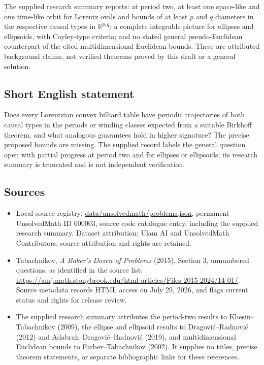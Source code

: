 \documentclass[11pt]{article}
\newcommand{\R}{\mathbb{R}}
\begin{document}
The supplied research summary reports: at period two, at least one space-like and one time-like orbit for Lorentz ovals and bounds of at least $p$ and $q$ diameters in the respective causal types in $\R^{p,q}$; a complete integrable picture for ellipses and ellipsoids, with Cayley-type criteria; and no stated general pseudo-Euclidean counterpart of the cited multidimensional Euclidean bounds. These are attributed background claims, not verified theorems proved by this draft or a general solution.
\subsection{Short English statement}
Does every Lorentzian convex billiard table have periodic trajectories of both causal types in the periods or winding classes expected from a suitable Birkhoff theorem, and what analogous guarantees hold in higher signature? The precise proposed bounds are missing. The supplied record labels the general question open with partial progress at period two and for ellipses or ellipsoids; its research summary is truncated and is not independent verification.
\subsection{Sources}
\begin{itemize}
\item Local source registry: \url{data/unsolvedmath/problems.json}, permanent UnsolvedMath ID $600003$, source code catalogue entry, including the supplied research summary. Dataset attribution: Ulam AI and UnsolvedMath Contributors; source attribution and rights are retained.
\item Tabachnikov, \emph{A Baker's Dozen of Problems} (2015), Section 3, unnumbered questions, as identified in the source list: \url{https://amj.math.stonybrook.edu/html-articles/Files-2015-2024/14-01/}. Source metadata records HTML access on July 29, 2026, and flags current status and rights for release review.
\item The supplied research summary attributes the period-two results to Khesin--Tabachnikov (2009), the ellipse and ellipsoid results to Dragovi\'c--Radnovi\'c (2012) and Adabrah--Dragovi\'c--Radnovi\'c (2019), and multidimensional Euclidean bounds to Farber--Tabachnikov (2002). It supplies no titles, precise theorem statements, or separate bibliographic links for these references.
\end{itemize}
\end{document}
